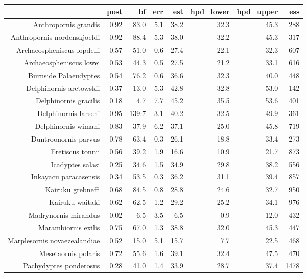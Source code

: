 \begin{table}[ht]
\centering
\begin{tabular}{rrrrrrrr}
  \hline
 & post & bf & err & est & hpd\_lower & hpd\_upper & ess \\ 
  \hline
Anthropornis grandis & 0.92 & 83.0 & 5.1 & 38.2 & 32.3 & 45.3 & 288 \\ 
  Anthropornis nordenskjoeldi & 0.92 & 88.4 & 5.3 & 38.0 & 32.2 & 45.3 & 317 \\ 
  Archaeospheniscus lopdelli & 0.57 & 51.0 & 0.6 & 27.4 & 22.1 & 32.3 & 607 \\ 
  Archaeospheniscus lowei & 0.53 & 44.3 & 0.5 & 27.5 & 21.2 & 33.1 & 616 \\ 
  Burnside Palaeudyptes & 0.54 & 76.2 & 0.6 & 36.6 & 32.3 & 40.0 & 448 \\ 
  Delphinornis arctowskii & 0.37 & 13.0 & 5.3 & 42.8 & 32.8 & 53.0 & 142 \\ 
  Delphinornis gracilis & 0.18 & 4.7 & 7.7 & 45.2 & 35.5 & 53.6 & 401 \\ 
  Delphinornis larseni & 0.95 & 139.7 & 3.1 & 40.2 & 32.5 & 49.9 & 361 \\ 
  Delphinornis wimani & 0.83 & 37.9 & 6.2 & 37.1 & 25.0 & 45.8 & 719 \\ 
  Duntroonornis parvus & 0.78 & 63.4 & 0.3 & 26.1 & 18.8 & 33.4 & 273 \\ 
  Eretiscus tonnii & 0.56 & 39.2 & 1.9 & 16.6 & 10.9 & 21.7 & 873 \\ 
  Icadyptes salasi & 0.25 & 34.6 & 1.5 & 34.9 & 29.8 & 38.2 & 556 \\ 
  Inkayacu paracasensis & 0.34 & 53.5 & 0.3 & 36.2 & 31.1 & 39.4 & 857 \\ 
  Kairuku grebneffi & 0.68 & 84.5 & 0.8 & 28.8 & 24.6 & 32.7 & 950 \\ 
  Kairuku waitaki & 0.62 & 62.5 & 1.2 & 29.2 & 25.2 & 34.1 & 976 \\ 
  Madrynornis mirandus & 0.02 & 6.5 & 3.5 & 6.5 & 0.9 & 12.0 & 432 \\ 
  Marambiornis exilis & 0.75 & 67.0 & 1.3 & 38.8 & 32.0 & 45.3 & 447 \\ 
  Marplesornis novaezealandiae & 0.52 & 15.0 & 5.1 & 15.7 & 7.7 & 22.5 & 468 \\ 
  Mesetaornis polaris & 0.72 & 55.6 & 1.6 & 39.1 & 32.4 & 47.5 & 470 \\ 
  Pachydyptes ponderosus & 0.28 & 41.0 & 1.4 & 33.9 & 28.7 & 37.4 & 1478 \\ 

\end{tabular}
\end{table}
